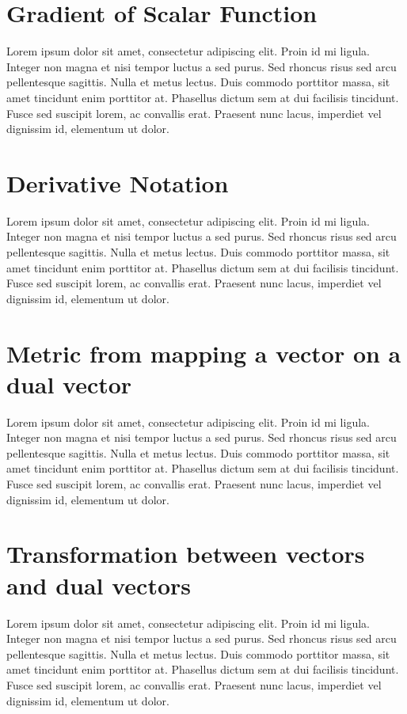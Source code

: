 \documentclass[natbib]{muthesis}
\begin{document}
  \section{Gradient of Scalar Function}
  Lorem ipsum dolor sit amet, consectetur adipiscing elit. Proin id mi ligula. Integer non magna et nisi tempor luctus a sed purus. Sed rhoncus risus sed arcu pellentesque sagittis. Nulla et metus lectus. Duis commodo porttitor massa, sit amet tincidunt enim porttitor at. Phasellus dictum sem at dui facilisis tincidunt. Fusce sed suscipit lorem, ac convallis erat. Praesent nunc lacus, imperdiet vel dignissim id, elementum ut dolor.

  \section{Derivative Notation}
  Lorem ipsum dolor sit amet, consectetur adipiscing elit. Proin id mi ligula. Integer non magna et nisi tempor luctus a sed purus. Sed rhoncus risus sed arcu pellentesque sagittis. Nulla et metus lectus. Duis commodo porttitor massa, sit amet tincidunt enim porttitor at. Phasellus dictum sem at dui facilisis tincidunt. Fusce sed suscipit lorem, ac convallis erat. Praesent nunc lacus, imperdiet vel dignissim id, elementum ut dolor.

  \section{Metric from mapping a vector on a dual vector}
  Lorem ipsum dolor sit amet, consectetur adipiscing elit. Proin id mi ligula. Integer non magna et nisi tempor luctus a sed purus. Sed rhoncus risus sed arcu pellentesque sagittis. Nulla et metus lectus. Duis commodo porttitor massa, sit amet tincidunt enim porttitor at. Phasellus dictum sem at dui facilisis tincidunt. Fusce sed suscipit lorem, ac convallis erat. Praesent nunc lacus, imperdiet vel dignissim id, elementum ut dolor.

  \section{Transformation between vectors and dual vectors}
  Lorem ipsum dolor sit amet, consectetur adipiscing elit. Proin id mi ligula. Integer non magna et nisi tempor luctus a sed purus. Sed rhoncus risus sed arcu pellentesque sagittis. Nulla et metus lectus. Duis commodo porttitor massa, sit amet tincidunt enim porttitor at. Phasellus dictum sem at dui facilisis tincidunt. Fusce sed suscipit lorem, ac convallis erat. Praesent nunc lacus, imperdiet vel dignissim id, elementum ut dolor.
\end{document}

